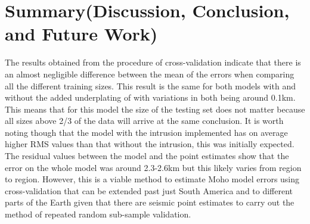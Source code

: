 \chapter{Summary(Discussion, Conclusion, and Future Work)}

The results obtained from the procedure of cross-validation indicate that there is an almost negligible difference between the mean of the errors when comparing all the different training sizes. This result is the same for both models with and without the added underplating of \cite{Mariani2013} with variations in both being around 0.1km. This means that for this model the size of the testing set does not matter because all sizes above 2/3 of the data will arrive at the same conclusion. It is worth noting though that the model with the intrusion implemented has on average higher RMS values than that without the intrusion, this was initially expected. The residual values between the model and the point estimates show that the error on the whole model was around 2.3-2.6km but this likely varies from region to region. However, this is a viable method to estimate Moho model errors using cross-validation that can be extended past just South America and to different parts of the Earth given that there are seismic point estimates to carry out the method of repeated random sub-sample validation.
